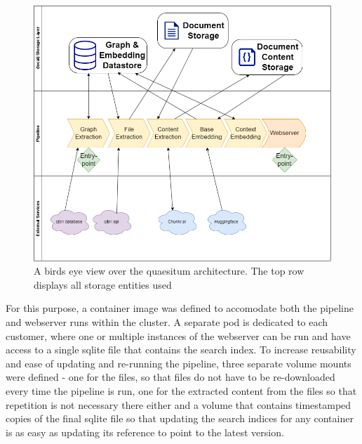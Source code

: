 \documentclass[draft,final]{vutinfth} %
\begin{document}
\begin{figure}
    \centering
    \includegraphics[width=1.0\linewidth]{graphics/quaesitum-arch.png}
    \caption{A birds eye view over the quaesitum architecture. The top row displays all storage entities used }
    \label{fig:quaesitum-arch}
\end{figure}

For this purpose, a container image was defined to accomodate both the pipeline and webserver runs within the cluster. A separate pod is dedicated to each customer, where one or multiple instances of the webserver can be run and have access to a single sqlite file that contains the search index. To increase reusability and ease of updating and re-running the pipeline, three separate volume mounts were defined - one for the files, so that files do not have to be re-downloaded every time the pipeline is run, one for the extracted content from the files so that repetition is not necessary there either and a volume that contains timestamped copies of the final sqlite file so that updating the search indices for any container is as easy as updating its reference to point to the latest version.
\end{document}

